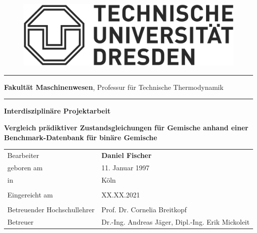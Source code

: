 \documentclass[../thesis.tex]{subfiles}
\begin{document}
\begin{titlepage}
	\begin{addmargin}[22mm]{0mm}
		\begin{figure}[t]
			\hspace*{5mm}\includegraphics[scale=0.35]{figs/Logo.png} \vspace{-8mm}
		\end{figure}
		\rule{140mm}{.4pt}
		\vspace{0.4mm}

		\scriptsize { {\bfseries Fakultät Maschinenwesen},
			Professur für Technische Thermodynamik}
		\vspace{-1.4mm}

		\rule{140mm}{.4pt}
		\vspace{2cm}

		{\Large \bfseries Interdisziplinäre Projektarbeit}
		\vspace{2cm}

		{\LARGE \bfseries Vergleich prädiktiver Zustandsgleichungen für Gemische anhand einer Benchmark-Datenbank für binäre Gemische \par}
		\vspace{2cm}
		\begin{addmargin}[-2mm]{0mm}
			\large
			\begin{tabular}{l l}
			  Bearbeiter                   & {\bfseries Daniel Fischer} \\
			  geboren am                   & 11. Januar 1997 \\
			  in                           & Köln \\ \\
			  Eingereicht am               & XX.XX.2021 \\ \\
			  Betreuender Hochschullehrer  & Prof. Dr. Cornelia Breitkopf \\
			  Betreuer                     & Dr.-Ing. Andreas Jäger, Dipl.-Ing. Erik Mickoleit \\
			\end{tabular}
		\end{addmargin}
	\end{addmargin}
\end{titlepage}
\end{document}
